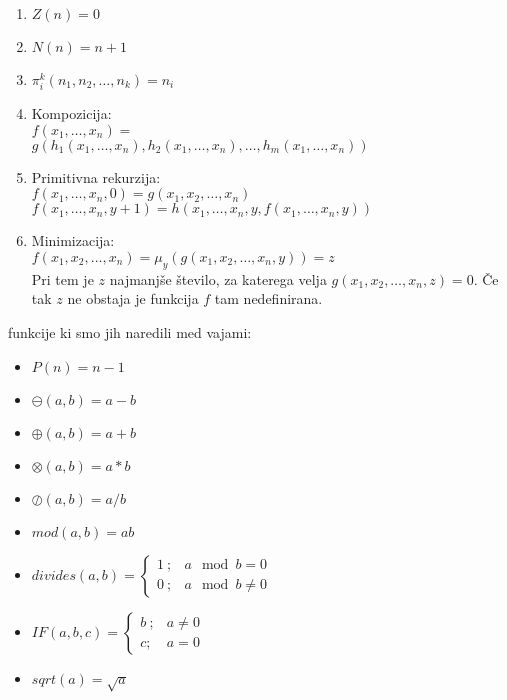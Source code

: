 \documentclass[a4paper]{article}
\begin{document}
\begin{multicols}{2}
\begin{enumerate}
\item $Z(n)=0$
\item $N(n)=n+1$
\item $\pi^k_i (n_1, n_2, \dots, n_k)=n_i$
\item Kompozicija: \\
	$ f(x_1, \dots, x_n) = $ \\ $ g(h_1(x_1, \dots, x_n), h_2(x_1,\dots, x_n), \dots, h_m(x_1, \dots, x_n)) $ 
\item Primitivna rekurzija: \\
	$ f(x_1, \dots, x_n, 0) = g(x_1, x_2, \dots, x_n) $ \\
	$ f(x_1, \dots, x_n, y+1) = h(x_1, \dots, x_n, y, f(x_1, \dots, x_n, y)) $
\item Minimizacija: \\
	$ f(x_1, x_2, \dots, x_n) = \mu_y (g(x_1, x_2, \dots, x_n, y)) = z $ \\
	Pri tem je $z$ najmanjše število, za katerega velja $g(x_1, x_2, \dots, x_n, z) = 0$. Če tak $z$ ne obstaja je funkcija $f$ tam nedefinirana.
\end{enumerate}
funkcije ki smo jih naredili med vajami:
\begin{itemize}
\item $P(n) = n-1$
\item $\ominus(a,b) = a-b$
\item $\oplus(a,b) = a+b$
\item $\otimes(a,b) = a*b$
\item $\oslash(a,b) = a/b$
\item $mod(a,b) = ab$
\item $divides(a,b) = \begin{cases} 1 \ ; & a \mod b = 0 \\ 0 \ ; & a \mod b \neq 0 \end{cases}$
\item $IF(a,b,c) = \begin{cases} b \ ; & a \neq 0 \\ c ; & a = 0 \end{cases}$
\item $sqrt(a) = \sqrt{a} $

\end{itemize}

\end{multicols}
\end{document}

